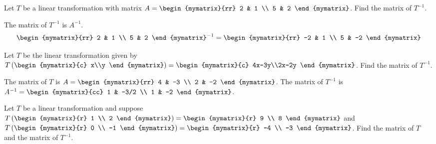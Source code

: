 \begin{enumialphparenastyle}
\begin{ex}
  Let $T$ be a linear transformation with matrix
  $A = \begin{mymatrix}{rr}
    2 & 1 \\
    5 & 2
  \end{mymatrix}$. Find the matrix of $T^{-1}$.
  \begin{sol}
    The matrix of $T^{-1}$ is $A^{-1}$.
    \begin{equation*}
      \begin{mymatrix}{rr}
        2 & 1 \\
        5 & 2
      \end{mymatrix} ^{-1} =
      \begin{mymatrix}{rr}
        -2 & 1 \\
        5 & -2
      \end{mymatrix}
    \end{equation*}
  \end{sol}
\end{ex}

\begin{ex}
  Let $T$ be the linear transformation given by
  $T\paren{\begin{mymatrix}{c} x\\y \end{mymatrix}} =
  \begin{mymatrix}{c} 4x-3y\\2x-2y \end{mymatrix}$.  Find the matrix
  of $T^{-1}$.
  \begin{sol}
    The matrix of $T$ is
    $A = \begin{mymatrix}{rr}
    4 & -3 \\
    2 & -2
  \end{mymatrix}$. The matrix of $T^{-1}$ is $A^{-1} =
  \begin{mymatrix}{cc}
    1 & -3/2 \\
    1 & -2
  \end{mymatrix}$.
  \end{sol}
\end{ex}

\begin{ex} Let $T$ be a linear transformation and suppose $T \paren{\begin{mymatrix}{r}
      1 \\
      2
    \end{mymatrix}} = \begin{mymatrix}{r}
    9 \\
    8
  \end{mymatrix}$ and $T \paren{\begin{mymatrix}{r}
      0 \\
      -1
    \end{mymatrix}} = \begin{mymatrix}{r}
    -4 \\
    -3
  \end{mymatrix}$.
  Find the matrix of $T$ and the matrix of $T^{-1}$.
\end{ex}

\end{enumialphparenastyle}
